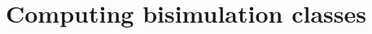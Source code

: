 \section{Computing bisimulation classes} \label{sec:bisim}

\cite{dovier04:_effic_algor_for_comput_bisim_equiv}

